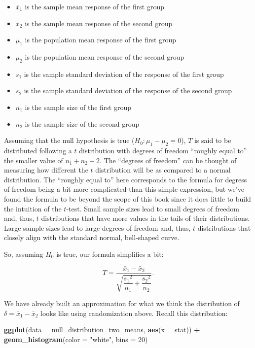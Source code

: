 \documentclass[12pt, krantz2,]{krantz}
\makeatletter
\newenvironment{Shaded}{\begin{snugshade}}{\end{snugshade}}
\newcommand{\DataTypeTok}[1]{\textcolor[rgb]{0.27,0.27,0.27}{#1}}
\newcommand{\DecValTok}[1]{\textcolor[rgb]{0.06,0.06,0.06}{#1}}
\newcommand{\KeywordTok}[1]{\textcolor[rgb]{0.27,0.27,0.27}{\textbf{#1}}}
\newcommand{\NormalTok}[1]{#1}
\newcommand{\OperatorTok}[1]{\textcolor[rgb]{0.43,0.43,0.43}{\textbf{#1}}}
\newcommand{\StringTok}[1]{\textcolor[rgb]{0.5,0.5,0.5}{#1}}
\providecommand{\tightlist}{%
  \setlength{\itemsep}{0pt}\setlength{\parskip}{0pt}}
\newenvironment{kframe}{%
\medskip{}
\setlength{\fboxsep}{.8em}
 \def\at@end@of@kframe{}%
 \ifinner\ifhmode%
  \def\at@end@of@kframe{\end{minipage}}%
  \begin{minipage}{\columnwidth}%
 \fi\fi%
 \def\FrameCommand##1{\hskip\@totalleftmargin \hskip-\fboxsep
 \colorbox{shadecolor}{##1}\hskip-\fboxsep
     \hskip-\linewidth \hskip-\@totalleftmargin \hskip\columnwidth}%
 \MakeFramed {\advance\hsize-\width
   \@totalleftmargin\z@ \linewidth\hsize
   \@setminipage}}%
 {\par\unskip\endMakeFramed%
 \at@end@of@kframe}
\renewenvironment{Shaded}{\begin{kframe}}{\end{kframe}}
\makeatother
\begin{document}
\begin{itemize}
\tightlist
\item
  \(\bar{x}_1\) is the sample mean response of the first group
\item
  \(\bar{x}_2\) is the sample mean response of the second group
\item
  \(\mu_1\) is the population mean response of the first group
\item
  \(\mu_2\) is the population mean response of the second group
\item
  \(s_1\) is the sample standard deviation of the response of the first group
\item
  \(s_2\) is the sample standard deviation of the response of the second group
\item
  \(n_1\) is the sample size of the first group
\item
  \(n_2\) is the sample size of the second group
\end{itemize}

Assuming that the null hypothesis is true (\(H_0: \mu_1 - \mu_2 = 0\)), \(T\) is said to be distributed following a \(t\) distribution with degrees of freedom ``roughly equal to'' the smaller value of \(n_1 + n_2 - 2\). The ``degrees of freedom'' can be thought of measuring how different the \(t\) distribution will be as compared to a normal distribution. The ``roughly equal to'' here corresponds to the formula for degress of freedom being a bit more complicated than this simple expression, but we've found the formula to be beyond the scope of this book since it does little to build the intuition of the \(t\)-test. Small sample sizes lead to small degrees of freedom and, thus, \(t\) distributions that have more values in the tails of their distributions. Large sample sizes lead to large degrees of freedom and, thus, \(t\) distributions that closely align with the standard normal, bell-shaped curve.

So, assuming \(H_0\) is true, our formula simplifies a bit:

\[T =\dfrac{ \bar{x}_1 - \bar{x}_2}{ \sqrt{\dfrac{{s_1}^2}{n_1} + \dfrac{{s_2}^2}{n_2}}  }.\]

We have already built an approximation for what we think the distribution of \(\delta = \bar{x}_1 - \bar{x}_2\) looks like using randomization above. Recall this distribution:

\begin{Shaded}
\begin{Highlighting}[]
\KeywordTok{ggplot}\NormalTok{(}\DataTypeTok{data =}\NormalTok{ null_distribution_two_means, }\KeywordTok{aes}\NormalTok{(}\DataTypeTok{x =}\NormalTok{ stat)) }\OperatorTok{+}
\StringTok{  }\KeywordTok{geom_histogram}\NormalTok{(}\DataTypeTok{color =} \StringTok{"white"}\NormalTok{, }\DataTypeTok{bins =} \DecValTok{20}\NormalTok{)}
\end{Highlighting}
\end{Shaded}
\end{document}
